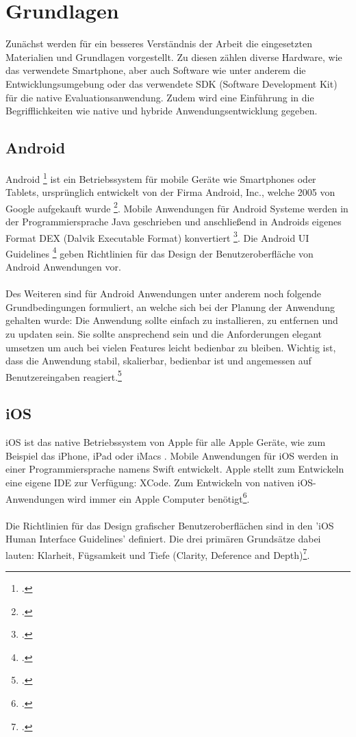 \chapter{Grundlagen}

Zunächst werden für ein besseres Verständnis der Arbeit die eingesetzten Materialien und Grundlagen vorgestellt. Zu diesen zählen diverse Hardware, wie das verwendete Smartphone, aber auch Software wie unter anderem die Entwicklungsumgebung oder das verwendete SDK (Software Development Kit) für die native Evaluationsanwendung. Zudem wird eine Einführung in die Begrifflichkeiten wie native und hybride Anwendungsentwicklung gegeben.

\section{Android} \label{AndroidPlattform}

Android \footcite{Android} ist ein Betriebssystem für mobile Geräte wie Smartphones oder Tablets, ursprünglich entwickelt von der Firma Android, Inc., welche 2005 von Google aufgekauft wurde \footcite{AndroidHistory}. Mobile Anwendungen für Android Systeme werden in der Programmiersprache Java geschrieben und anschließend in Androids eigenes Format DEX (Dalvik Executable Format) konvertiert \footcite{AndroidCookbook}. Die Android UI Guidelines \footcite{AndroidGuidelines} geben Richtlinien für das Design der Benutzeroberfläche von Android Anwendungen vor.
\\
\\
Des Weiteren sind für Android Anwendungen unter anderem noch folgende Grundbedingungen formuliert, an welche sich bei der Planung der Anwendung gehalten wurde: Die Anwendung sollte einfach zu installieren, zu entfernen und zu updaten sein. Sie sollte ansprechend sein und die Anforderungen elegant umsetzen um auch bei vielen Features leicht bedienbar zu bleiben. Wichtig ist, dass die Anwendung stabil, skalierbar, bedienbar ist und angemessen auf Benutzereingaben reagiert.\footcite{AndroidCookbook}

\section{iOS}

iOS ist das native Betriebssystem von Apple für alle Apple Geräte, wie zum Beispiel das iPhone, iPad oder iMacs . Mobile Anwendungen für iOS werden in einer Programmiersprache  namens Swift entwickelt. Apple stellt zum Entwickeln eine eigene IDE zur Verfügung: XCode. Zum Entwickeln von nativen iOS-Anwendungen wird immer ein Apple Computer benötigt\footcite{iOS}. 
\\
\\
Die Richtlinien für das Design grafischer Benutzeroberflächen sind in den 'iOS Human Interface Guidelines' definiert. Die drei primären Grundsätze dabei lauten: Klarheit, Fügsamkeit und Tiefe (Clarity, Deference and Depth)\footcite{iOSGUI}. 

